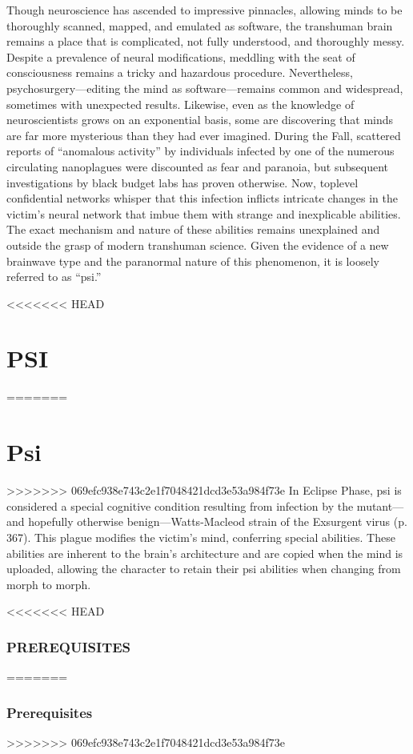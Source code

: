 \newpage



Though neuroscience has ascended to impressive pinnacles, allowing minds to be thoroughly scanned, mapped, and emulated as software, the transhuman brain remains a place that is complicated, not fully understood, and thoroughly messy. Despite a prevalence of neural modifications, meddling with the seat of consciousness remains a tricky and hazardous procedure. Nevertheless, psychosurgery—editing the mind as software—remains common and widespread, sometimes with unexpected results. Likewise, even as the knowledge of neuroscientists grows on an exponential basis, some are discovering that minds are far more mysterious than they had ever imagined. During the Fall, scattered reports of “anomalous activity” by individuals infected by one of the numerous circulating nanoplagues were discounted as fear and paranoia, but subsequent investigations by black budget labs has proven otherwise. Now, toplevel confidential networks whisper that this infection inflicts intricate changes in the victim’s neural network that imbue them with strange and inexplicable abilities. The exact mechanism and nature of these abilities remains unexplained and outside the grasp of modern transhuman science. Given the evidence of a new brainwave type and the paranormal nature of this phenomenon, it is loosely referred to as “psi.” 

<<<<<<< HEAD \section{PSI} ======= \section{Psi} >>>>>>> 069efc938e743c2e1f7048421dcd3e53a984f73e In Eclipse Phase, psi is considered a special cognitive condition resulting from infection by the mutant—and hopefully otherwise benign—Watts-Macleod strain of the Exsurgent virus (p. 367). This plague modifies the victim’s mind, conferring special abilities. These abilities are inherent to the brain’s architecture and are copied when the mind is uploaded, allowing the character to retain their psi abilities when changing from morph to morph. 

<<<<<<< HEAD \subsubsection{PREREQUISITES} ======= \subsubsection{Prerequisites} >>>>>>> 069efc938e743c2e1f7048421dcd3e53a984f73e 

